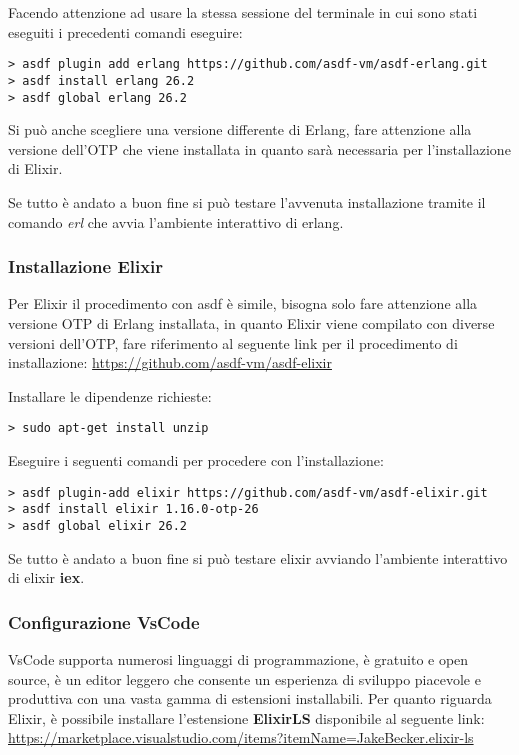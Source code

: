 Facendo attenzione ad usare la stessa sessione del terminale in cui sono
stati eseguiti i precedenti comandi eseguire:

\begin{lstlisting}[language=none]
> asdf plugin add erlang https://github.com/asdf-vm/asdf-erlang.git
> asdf install erlang 26.2
> asdf global erlang 26.2 
\end{lstlisting}

Si può anche scegliere una versione differente di Erlang, fare attenzione
alla versione dell'OTP che viene installata in quanto sarà
necessaria per l'installazione di Elixir.

Se tutto è andato a buon fine si può testare l'avvenuta installazione
tramite il comando \textit{erl} che avvia l'ambiente interattivo di erlang.

\subsubsection{Installazione Elixir}

Per Elixir il procedimento con asdf è simile, bisogna solo fare
attenzione alla versione OTP di Erlang installata, in quanto
Elixir viene compilato con diverse versioni dell'OTP,
fare riferimento al seguente link per il procedimento di installazione:
\url{https://github.com/asdf-vm/asdf-elixir}

Installare le dipendenze richieste:
\begin{lstlisting}[language=none]
> sudo apt-get install unzip
\end{lstlisting}

Eseguire i seguenti comandi per procedere con l'installazione:
\begin{lstlisting}[language=none]
> asdf plugin-add elixir https://github.com/asdf-vm/asdf-elixir.git
> asdf install elixir 1.16.0-otp-26
> asdf global elixir 26.2 
\end{lstlisting}

Se tutto è andato a buon fine si può testare elixir avviando l'ambiente
interattivo di elixir \textbf{iex}.


\subsubsection{Configurazione VsCode}

VsCode supporta numerosi linguaggi di programmazione, è gratuito e
open source, è un editor leggero che consente un esperienza di sviluppo
piacevole e produttiva con una vasta gamma di estensioni installabili.
Per quanto riguarda Elixir, è possibile installare l'estensione
\textbf{ElixirLS} disponibile al seguente link:
\url{https://marketplace.visualstudio.com/items?itemName=JakeBecker.elixir-ls}
 